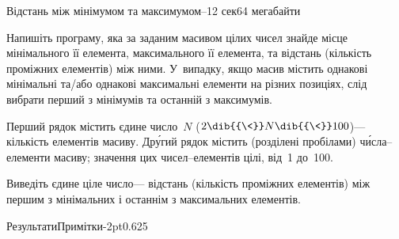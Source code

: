 \begin{problem}{Відстань між мінімумом та максимумом--1}{\stdinOrInputTxt}{\stdoutOrOutputTxt}{2 сек}{64 мегабайти}

Напишіть програму, яка за заданим масивом цілих чисел знайде місце мінімального її елемента, максимального її елемента, та відстань (кількість проміжних елементів) між ними. У~випадку, якщо масив містить однакові мінімальні та\slash{}або однакові максимальні елементи на різних позиціях, слід вибрати перший з мінімумів та останній з максимумів.

\InputFile
Перший рядок містить єдине число~$N$ ($2\dib{{\<}}N\dib{{\<}}100$)\nolinebreak[3] --- кількість елементів масиву. Др\'{у}гий рядок містить (розділені пробілами) ч\'{и}сла--елементи масиву; значення цих чисел--елементів цілі, від~1 до~100.

\OutputFile
Виведіть єдине ціле число\nolinebreak[3] --- відстань (кількість проміжних елементів) між першим з мінімальних і останнім з максимальних елементів.

{

\Examples

\vspace{-1.125\baselineskip}

\makeTableLongtrue
\noindent\begin{exampleThreeWithSpecNameColTwoAndLineStretch}{7.5em}{5em}{\ifAfour 11cm\else 10cm\fi}{Результати}{Примітки}{\ifAfour -2pt\else -5pt\fi}{-2pt}{0.625}
%
%
%
%
\end{exampleThreeWithSpecNameColTwoAndLineStretch}

}
\end{problem}

